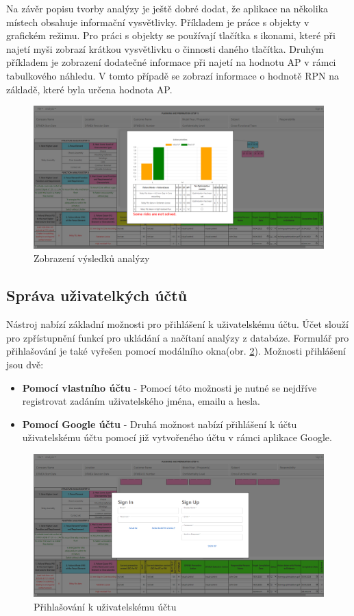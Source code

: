 Na závěr popisu tvorby analýzy je ještě dobré dodat, že aplikace na několika místech obsahuje informační vysvětlivky. Příkladem je práce s objekty v grafickém režimu. Pro práci s objekty se používají tlačítka s ikonami, které při najetí myši zobrazí krátkou vysvětlivku o činnosti daného tlačítka. Druhým příkladem je zobrazení dodatečné informace při najetí na hodnotu AP v rámci tabulkového náhledu. V tomto případě se zobrazí informace o hodnotě RPN na základě, které byla určena hodnota AP. 
\begin{figure}[h]
\centering
	\includegraphics[width=1.0\textwidth]{Figures/results.png}
	\caption{Zobrazení výsledků analýzy}
	\label{fig:results}
\end{figure}

\newpage
\subsection{Správa uživatelkých účtů}
Nástroj nabízí základní možnosti pro přihlášení k uživatelskému účtu. Účet slouží pro zpřístupnění funkcí pro ukládání a načítaní analýzy z databáze. Formulář pro přihlašování je také vyřešen pomocí modálního okna(obr. \ref{fig:sign}). Možnosti přihlášení jsou dvě: 
\begin{itemize}
    \item \textbf{Pomocí vlastního účtu} - Pomocí této možnosti je nutné se nejdříve registrovat zadáním uživatelského jména, emailu a hesla.  
    \item \textbf{Pomocí Google účtu} - Druhá možnost nabízí přihlášení k účtu uživatelskému účtu pomocí již vytvořeného účtu v rámci aplikace Google.
\end{itemize}

\begin{figure}[t]
\centering
	\includegraphics[width=1.0\textwidth]{Figures/sign.png}
	\caption{Přihlašování k uživatelskému účtu}
	\label{fig:sign}
\end{figure}

